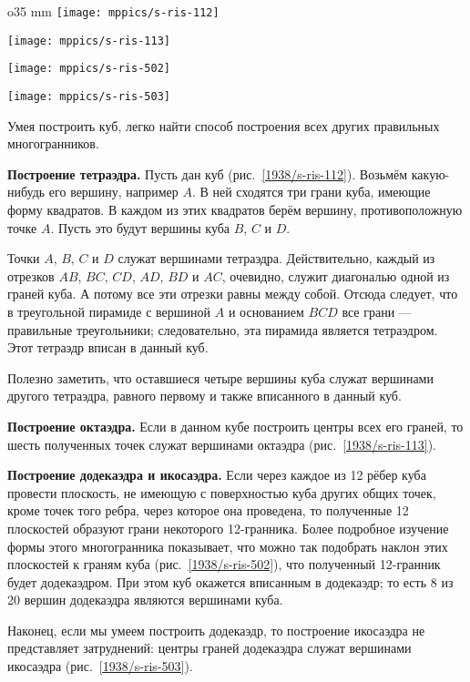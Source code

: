 \begin{wrapfigure}{o}{35 mm}
\vskip-0mm
\centering
\texttt{[image: mppics/s-ris-112]}
\caption{}\label{1938/s-ris-112}
\bigskip
\texttt{[image: mppics/s-ris-113]}
\caption{}\label{1938/s-ris-113}
\bigskip
\texttt{[image: mppics/s-ris-502]}
\caption{}\label{1938/s-ris-502}
\bigskip
\texttt{[image: mppics/s-ris-503]}
\caption{}\label{1938/s-ris-503}
\vskip-0mm
\end{wrapfigure}

Умея построить куб, легко найти способ построения всех других правильных многогранников.

\textbf{Построение тетраэдра.}
Пусть дан куб (рис.~\ref{1938/s-ris-112}).
Возьмём какую-нибудь его вершину, например $A$.
В ней сходятся три грани куба, имеющие форму квадратов.
В каждом из этих квадратов берём вершину, противоположную точке $A$.
Пусть это будут вершины куба $B$, $C$ и $D$.

Точки $A$, $B$, $C$ и $D$ служат вершинами тетраэдра.
Действительно, каждый из отрезков $AB$, $BC$, $CD$, $AD$, $BD$ и $AC$, очевидно, служит диагональю одной из граней куба.
А потому все эти отрезки равны между собой.
Отсюда следует, что в треугольной пирамиде с вершиной $A$ и основанием $BCD$ все грани — правильные треугольники; следовательно, эта пирамида является тетраэдром.
Этот тетраэдр вписан в данный куб.

Полезно заметить, что оставшиеся четыре вершины куба служат вершинами другого тетраэдра, равного первому и также вписанного в данный куб.


\textbf{Построение октаэдра.}
Если в данном кубе построить центры всех его граней, то шесть полученных точек служат вершинами октаэдра (рис.~\ref{1938/s-ris-113}).

\textbf{Построение додекаэдра и икосаэдра.}
Если через каждое из 12 рёбер куба провести плоскость, не имеющую с поверхностью куба других общих точек, кроме точек того ребра, через которое она проведена, то полученные 12 плоскостей образуют грани некоторого 12-гранника.
Более подробное изучение формы этого многогранника показывает, что можно так подобрать наклон этих плоскостей к граням куба (рис.~\ref{1938/s-ris-502}), что полученный 12-гранник будет додекаэдром.
При этом куб окажется вписанным в додекаэдр; то есть 8 из 20 вершин додекаэдра являются вершинами куба.

Наконец, если мы умеем построить додекаэдр, то построение икосаэдра не представляет затруднений: центры граней додекаэдра служат вершинами икосаэдра (рис.~\ref{1938/s-ris-503}).

